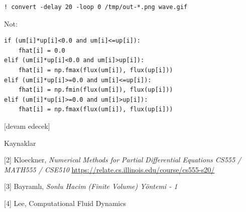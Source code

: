 \documentclass[12pt,fleqn]{article}\usepackage{../../common}
\begin{document}
\begin{verbatim}
! convert -delay 20 -loop 0 /tmp/out-*.png wave.gif
\end{verbatim}

Not:

\begin{verbatim}
if (um[i]*up[i]<0.0 and um[i]<=up[i]):
    fhat[i] = 0.0
elif (um[i]*up[i]<0.0 and um[i]>up[i]):
    fhat[i] = np.fmax(flux(um[i]), flux(up[i]))
elif (um[i]*up[i]>=0.0 and um[i]<=up[i]):
    fhat[i] = np.fmin(flux(um[i]), flux(up[i]))
elif (um[i]*up[i]>=0.0 and um[i]>up[i]):
    fhat[i] = np.fmax(flux(um[i]), flux(up[i]))
\end{verbatim}




[devam edecek]
  
Kaynaklar

[2] Kloeckner, {\em Numerical Methods for Partial Differential Equations CS555 / MATH555 / CSE510}
    \url{https://relate.cs.illinois.edu/course/cs555-s20/}

[3] Bayramlı, {\em Sonlu Hacim (Finite Volume) Yöntemi - 1}

[4] Lee, Computational Fluid Dynamics
\end{document}
